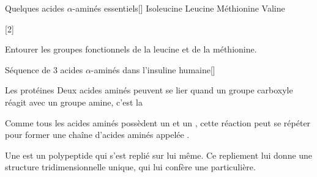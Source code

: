 \begin{doc}{Quelques acides $\alpha$-aminés essentiels}[\label{doc:aa_essentiels}]
  \centering
  \chemname {\chemfig{!\isoleucine}} {Isoleucine}
  \chemname {\chemfig{!\leucine}}    {Leucine}
  \chemname {\chemfig{!\methionine}} {Méthionine}
  \chemname {\chemfig{!\valine}}     {Valine}
\end{doc}

[2]

\numeroQuestion Entourer les groupes fonctionnels de la leucine et de la méthionine.


\begin{doc}{Séquence de 3 acides $\alpha$-aminés dans l'insuline humaine}[\label{doc:insuline_aa}]
  \begin{center}
  \end{center}
\end{doc}

\begin{doc}{Les protéines}
  Deux acides aminés peuvent se lier quand un groupe carboxyle réagit avec un groupe amine, c'est la 

  \vspace*{-14pt}
  \begin{center}
  \end{center}
  \vspace*{-18pt}

  Comme tous les acides aminés possèdent un  et un , cette réaction peut se répéter pour former une chaîne d'acides aminés appelée .

  \begin{importants}
    Une  est un polypeptide qui s'est replié sur lui même.
    Ce repliement lui donne une structure tridimensionnelle unique, qui lui confère une  particulière.
  \end{importants}
  \begin{center}
  \end{center}
\end{doc}



